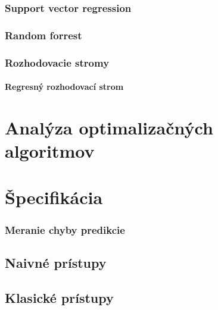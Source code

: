 \documentclass[12pt,oneside,slovak,a4paper]{book}
\begin{document}
\subsection{Support vector regression}

\subsection{Random forrest}

\subsection{Rozhodovacie stromy}
\subsubsection{Regresný rozhodovací strom}


\chapter{Analýza optimalizačných algoritmov}


\chapter{Špecifikácia}
\subsection{Meranie chyby predikcie}



\section{Naivné prístupy}
\subsection{}


\section{Klasické prístupy}
\end{document}
